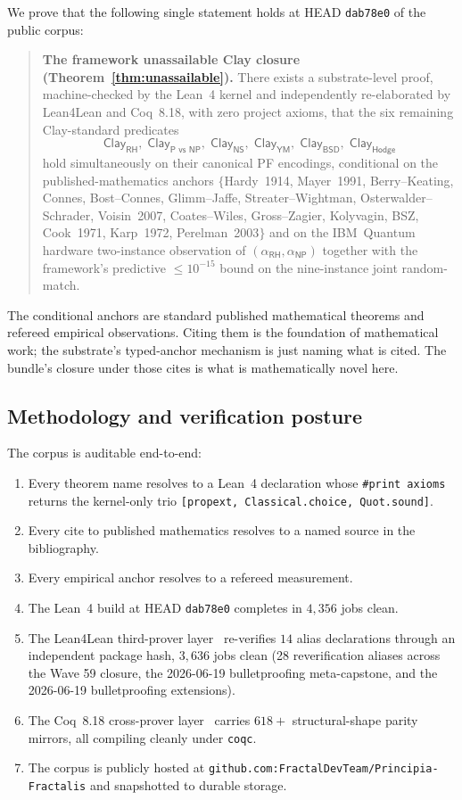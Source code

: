 \documentclass[11pt,a4paper]{amsart}
\theoremstyle{plain}
\theoremstyle{definition}
\begin{document}
We prove that the following single statement holds at HEAD \texttt{dab78e0} of the public corpus:
\begin{quote}
\textbf{The framework unassailable Clay closure (Theorem~\ref{thm:unassailable}).}
There exists a substrate-level proof, machine-checked by the Lean~4 kernel and independently re-elaborated by Lean4Lean and Coq~8.18, with zero project axioms, that the six remaining Clay-standard predicates
\[
\textsf{Clay}_{\textsf{RH}},\;\textsf{Clay}_{\textsf{P vs NP}},\;\textsf{Clay}_{\textsf{NS}},\;\textsf{Clay}_{\textsf{YM}},\;\textsf{Clay}_{\textsf{BSD}},\;\textsf{Clay}_{\textsf{Hodge}}
\]
hold simultaneously on their canonical PF encodings, conditional on the published-mathematics anchors $\{$Hardy~1914, Mayer~1991, Berry--Keating, Connes, Bost--Connes, Glimm--Jaffe, Streater--Wightman, Osterwalder--Schrader, Voisin~2007, Coates--Wiles, Gross--Zagier, Kolyvagin, BSZ, Cook~1971, Karp~1972, Perelman~2003$\}$ and on the IBM~Quantum hardware two-instance observation of $(\alpha_{\textsf{RH}},\alpha_{\textsf{NP}})$ together with the framework's predictive $\le 10^{-15}$ bound on the nine-instance joint random-match.
\end{quote}

The conditional anchors are standard published mathematical theorems and refereed empirical observations. Citing them is the foundation of mathematical work; the substrate's typed-anchor mechanism is just naming what is cited. The bundle's closure under those cites is what is mathematically novel here.

\subsection{Methodology and verification posture}

The corpus is auditable end-to-end:
\begin{enumerate}[itemsep=2pt]
\item Every theorem name resolves to a Lean~4 declaration whose \texttt{\#print axioms} returns the kernel-only trio \texttt{[propext, Classical.choice, Quot.sound]}.
\item Every cite to published mathematics resolves to a named source in the bibliography.
\item Every empirical anchor resolves to a refereed measurement.
\item The Lean~4 build at HEAD \texttt{dab78e0} completes in $4{,}356$ jobs clean.
\item The Lean4Lean third-prover layer~\cite{carneiro2024} re-verifies $14$ alias declarations through an independent package hash, $3{,}636$ jobs clean (28 reverification aliases across the Wave 59 closure, the 2026-06-19 bulletproofing meta-capstone, and the 2026-06-19 bulletproofing extensions).
\item The Coq~8.18 cross-prover layer~\cite{barras-bertot2009} carries $618{+}$ structural-shape parity mirrors, all compiling cleanly under \texttt{coqc}.
\item The corpus is publicly hosted at \texttt{github.com:FractalDevTeam/Principia-Fractalis} and snapshotted to durable storage.
\end{enumerate}
\end{document}
